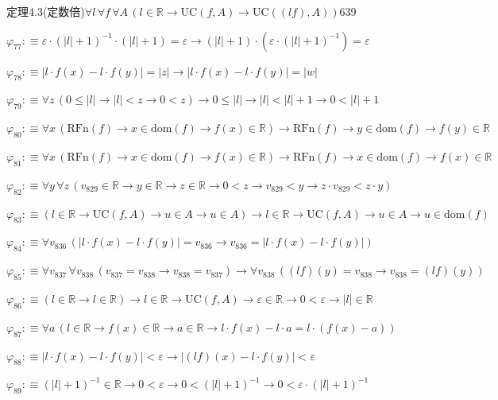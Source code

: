 \begin{fullproof}{定理4.3(定数倍)}{$\forall l\,\forall f\,\forall A\,(l \in \mathbb{R} \to \mathrm{UC}(f,A) \to \mathrm{UC}((l f),A))$}{639}
\begin{abbrevlist}
\item $\varphi_{77} :\equiv \varepsilon \cdot (\lvert l \rvert + 1)^{-1} \cdot (\lvert l \rvert + 1) = \varepsilon \to (\lvert l \rvert + 1) \cdot (\varepsilon \cdot (\lvert l \rvert + 1)^{-1}) = \varepsilon$
\item $\varphi_{78} :\equiv \lvert l \cdot f(x) - l \cdot f(y) \rvert = \lvert z \rvert \to \lvert l \cdot f(x) - l \cdot f(y) \rvert = \lvert w \rvert$
\item $\varphi_{79} :\equiv \forall z\,(0 \leq \lvert l \rvert \to \lvert l \rvert < z \to 0 < z) \to 0 \leq \lvert l \rvert \to \lvert l \rvert < \lvert l \rvert + 1 \to 0 < \lvert l \rvert + 1$
\item $\varphi_{80} :\equiv \forall x\,(\mathrm{RFn}(f) \to x \in \mathrm{dom}(f) \to f(x) \in \mathbb{R}) \to \mathrm{RFn}(f) \to y \in \mathrm{dom}(f) \to f(y) \in \mathbb{R}$
\item $\varphi_{81} :\equiv \forall x\,(\mathrm{RFn}(f) \to x \in \mathrm{dom}(f) \to f(x) \in \mathbb{R}) \to \mathrm{RFn}(f) \to x \in \mathrm{dom}(f) \to f(x) \in \mathbb{R}$
\item $\varphi_{82} :\equiv \forall y\,\forall z\,(v_{829} \in \mathbb{R} \to y \in \mathbb{R} \to z \in \mathbb{R} \to 0 < z \to v_{829} < y \to z \cdot v_{829} < z \cdot y)$
\item $\varphi_{83} :\equiv (l \in \mathbb{R} \to \mathrm{UC}(f,A) \to u \in A \to u \in A) \to l \in \mathbb{R} \to \mathrm{UC}(f,A) \to u \in A \to u \in \mathrm{dom}(f)$
\item $\varphi_{84} :\equiv \forall v_{836}\,(\lvert l \cdot f(x) - l \cdot f(y) \rvert = v_{836} \to v_{836} = \lvert l \cdot f(x) - l \cdot f(y) \rvert)$
\item $\varphi_{85} :\equiv \forall v_{837}\,\forall v_{838}\,(v_{837} = v_{838} \to v_{838} = v_{837}) \to \forall v_{838}\,((l f)(y) = v_{838} \to v_{838} = (l f)(y))$
\item $\varphi_{86} :\equiv (l \in \mathbb{R} \to l \in \mathbb{R}) \to l \in \mathbb{R} \to \mathrm{UC}(f,A) \to \varepsilon \in \mathbb{R} \to 0 < \varepsilon \to \lvert l \rvert \in \mathbb{R}$
\item $\varphi_{87} :\equiv \forall a\,(l \in \mathbb{R} \to f(x) \in \mathbb{R} \to a \in \mathbb{R} \to l \cdot f(x) - l \cdot a = l \cdot (f(x) - a))$
\item $\varphi_{88} :\equiv \lvert l \cdot f(x) - l \cdot f(y) \rvert < \varepsilon \to \lvert (l f)(x) - l \cdot f(y) \rvert < \varepsilon$
\item $\varphi_{89} :\equiv (\lvert l \rvert + 1)^{-1} \in \mathbb{R} \to 0 < \varepsilon \to 0 < (\lvert l \rvert + 1)^{-1} \to 0 < \varepsilon \cdot (\lvert l \rvert + 1)^{-1}$

\end{abbrevlist}
\end{fullproof}

